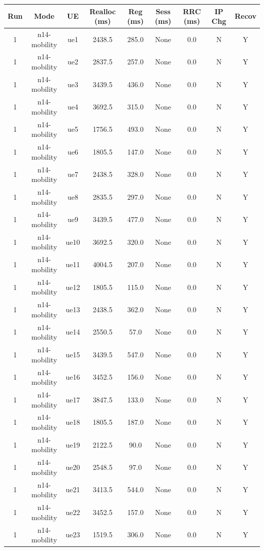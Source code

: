 \begin{table}[ht]
\centering
\begin{tabular}{|c|c|c|c|c|c|c|c|c|}
\hline
Run & Mode & UE & Realloc (ms) & Reg (ms) & Sess (ms) & RRC (ms) & IP Chg & Recov \\
\hline
1 & n14-mobility & ue1 & 2438.5 & 285.0 & None & 0.0 & N & Y \\
1 & n14-mobility & ue2 & 2837.5 & 257.0 & None & 0.0 & N & Y \\
1 & n14-mobility & ue3 & 3439.5 & 436.0 & None & 0.0 & N & Y \\
1 & n14-mobility & ue4 & 3692.5 & 315.0 & None & 0.0 & N & Y \\
1 & n14-mobility & ue5 & 1756.5 & 493.0 & None & 0.0 & N & Y \\
1 & n14-mobility & ue6 & 1805.5 & 147.0 & None & 0.0 & N & Y \\
1 & n14-mobility & ue7 & 2438.5 & 328.0 & None & 0.0 & N & Y \\
1 & n14-mobility & ue8 & 2835.5 & 297.0 & None & 0.0 & N & Y \\
1 & n14-mobility & ue9 & 3439.5 & 477.0 & None & 0.0 & N & Y \\
1 & n14-mobility & ue10 & 3692.5 & 320.0 & None & 0.0 & N & Y \\
1 & n14-mobility & ue11 & 4004.5 & 207.0 & None & 0.0 & N & Y \\
1 & n14-mobility & ue12 & 1805.5 & 115.0 & None & 0.0 & N & Y \\
1 & n14-mobility & ue13 & 2438.5 & 362.0 & None & 0.0 & N & Y \\
1 & n14-mobility & ue14 & 2550.5 & 57.0 & None & 0.0 & N & Y \\
1 & n14-mobility & ue15 & 3439.5 & 547.0 & None & 0.0 & N & Y \\
1 & n14-mobility & ue16 & 3452.5 & 156.0 & None & 0.0 & N & Y \\
1 & n14-mobility & ue17 & 3847.5 & 133.0 & None & 0.0 & N & Y \\
1 & n14-mobility & ue18 & 1805.5 & 187.0 & None & 0.0 & N & Y \\
1 & n14-mobility & ue19 & 2122.5 & 90.0 & None & 0.0 & N & Y \\
1 & n14-mobility & ue20 & 2548.5 & 97.0 & None & 0.0 & N & Y \\
1 & n14-mobility & ue21 & 3413.5 & 544.0 & None & 0.0 & N & Y \\
1 & n14-mobility & ue22 & 3452.5 & 157.0 & None & 0.0 & N & Y \\
1 & n14-mobility & ue23 & 1519.5 & 306.0 & None & 0.0 & N & Y \\

\end{tabular}
\end{table}
